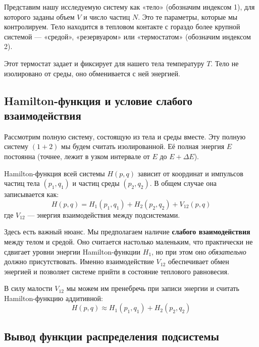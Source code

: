 \documentclass[../general/general]{subfiles}
\begin{document}
Представим нашу исследуемую систему как «тело» (обозначим индексом 1), для которого заданы объем $V$ и число частиц $N$. Это те параметры, которые мы контролируем. Тело находится в тепловом контакте с гораздо более крупной системой — «средой», «резервуаром» или «термостатом» (обозначим индексом 2).


Этот термостат задает и фиксирует для нашего тела температуру $T$. Тело не изолировано от среды, оно обменивается с ней энергией. 

\subsection{Hamilton-функция и условие слабого взаимодействия}

Рассмотрим полную систему, состоящую из тела и среды вместе. Эту полную систему $(1+2)$ мы будем считать изолированной. Её полная энергия $E$ постоянна (точнее, лежит в узком интервале от $E$ до $E + \Delta E$).

Hamilton-функция всей системы $H(p, q)$ зависит от координат и импульсов частиц тела $(p_1, q_1)$ и частиц среды $(p_2, q_2)$. В общем случае она записывается как:
\begin{equation}
H(p, q) = H_1(p_1, q_1) + H_2(p_2, q_2) + V_{12}(p, q)
\end{equation}
где $V_{12}$ — энергия взаимодействия между подсистемами.

Здесь есть важный нюанс. Мы предполагаем наличие \textbf{слабого взаимодействия} между телом и средой. Оно считается настолько маленьким, что практически не сдвигает уровни энергии Hamilton-функции $H_1$, но при этом оно \textit{обязательно} должно присутствовать. Именно взаимодействие $V_{12}$ обеспечивает обмен энергией и позволяет системе прийти в состояние теплового равновесия.

В силу малости $V_{12}$ мы можем им пренебречь при записи энергии и считать Hamilton-функцию аддитивной:
\begin{equation}
H(p, q) \approx H_1(p_1, q_1) + H_2(p_2, q_2)
\end{equation}

\subsection{Вывод функции распределения подсистемы}
\end{document}
